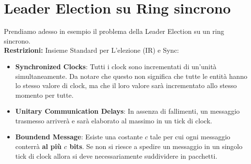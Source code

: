 \section{Leader Election su Ring sincrono}
Prendiamo adesso in esempio il problema della Leader Election su un ring
sincrono.\\
\textbf{Restrizioni:} Insieme Standard per L'elezione (IR) e Sync:
\begin{itemize}
    \item \textbf{Synchronized Clocks}: Tutti i clock sono incrementati di
          un'unità simultaneamente. Da notare che questo non significa che tutte le
          entità hanno lo stesso valore di clock, ma che il loro valore sarà
          incrementato allo stesso momento per tutte.
    \item \textbf{Unitary Communication Delays}: In assenza di fallimenti, un
          messaggio trasmesso arriverà e sarà elaborato al massimo in un tick di clock.
    \item \textbf{Boundend Message}: Esiste una costante $c$ tale per cui ogni
          messaggio conterrà \textbf{al più $c$ bits}. Se non si riesce a spedire un
          messaggio in un singolo tick di clock allora si deve necessariamente
          suddividere in pacchetti.
\end{itemize}



